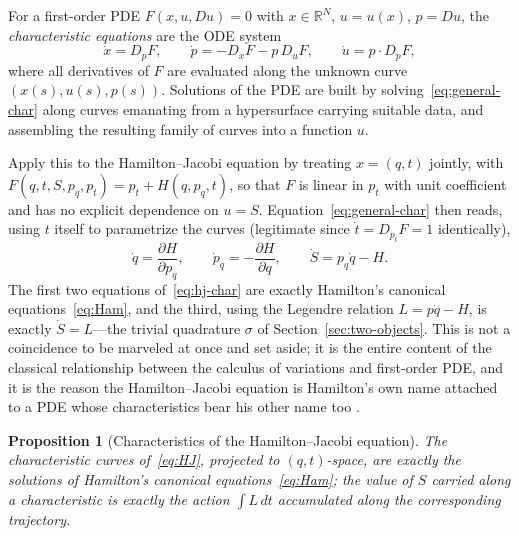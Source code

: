 \documentclass[11pt]{article}
\newtheorem{proposition}{Proposition}[section]
\newcommand{\dd}[2]{\frac{\partial #1}{\partial #2}}
\newcommand{\R}{\mathbb{R}}
\begin{document}
For a first-order PDE $F(x,u,Du)=0$ with $x\in\R^N$, $u=u(x)$, $p=Du$, the \emph{characteristic equations} are the ODE system
\begin{equation}
\label{eq:general-char}
\dot x = D_pF, \qquad \dot p = -D_xF - p\,D_uF, \qquad \dot u = p\cdot D_pF ,
\end{equation}
where all derivatives of $F$ are evaluated along the unknown curve $(x(s),u(s),p(s))$. Solutions of the PDE are built by solving~\eqref{eq:general-char} along curves emanating from a hypersurface carrying suitable data, and assembling the resulting family of curves into a function $u$.

Apply this to the Hamilton--Jacobi equation by treating $x=(q,t)$ jointly, with $F(q,t,S,p_q,p_t) = p_t + H(q,p_q,t)$, so that $F$ is linear in $p_t$ with unit coefficient and has no explicit dependence on $u=S$. Equation~\eqref{eq:general-char} then reads, using $t$ itself to parametrize the curves (legitimate since $\dot t = D_{p_t}F=1$ identically),
\begin{equation}
\label{eq:hj-char}
\dot q = \dd{H}{p_q}, \qquad \dot p_q = -\dd{H}{q}, \qquad \dot S = p_q\dot q - H .
\end{equation}
The first two equations of~\eqref{eq:hj-char} are exactly Hamilton's canonical equations~\eqref{eq:Ham}, and the third, using the Legendre relation $L=p\dot q - H$, is exactly $\dot S = L$---the trivial quadrature $\sigma$ of Section~\ref{sec:two-objects}. This is not a coincidence to be marveled at once and set aside; it is the entire content of the classical relationship between the calculus of variations and first-order PDE, and it is the reason the Hamilton--Jacobi equation is Hamilton's own name attached to a PDE whose characteristics bear his other name too \citep{evans2010}.

\begin{proposition}[Characteristics of the Hamilton--Jacobi equation]
\label{prop:characteristics}
The characteristic curves of~\eqref{eq:HJ}, projected to $(q,t)$-space, are exactly the solutions of Hamilton's canonical equations~\eqref{eq:Ham}; the value of $S$ carried along a characteristic is exactly the action $\int L\,dt$ accumulated along the corresponding trajectory.
\end{proposition}
\end{document}
